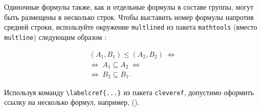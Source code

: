 Одиночные формулы также, как и отдельные формулы в составе группы, могут быть размещены в несколько строк. Чтобы выставить номер формулы напротив средней строки, используйте окружение \verb|multlined| из пакета \verb|mathtools| (вместо \verb|multline|) следующим образом \cite{Ganter1999}:

\begin{equation} %
\label{eq:fConcept-order-G}
\begin{multlined}
(A_1,B_1)\leq (A_2,B_2)\; \Leftrightarrow \\  \Leftrightarrow\; A_1\subseteq A_2\; \Leftrightarrow \\ \Leftrightarrow\; B_2\subseteq B_1. 
\end{multlined}
\end{equation}

	
Используя команду \verb|\labelcref{...}| из пакета \verb|cleveref|, допустимо оформить ссылку на несколько формул, например, ().